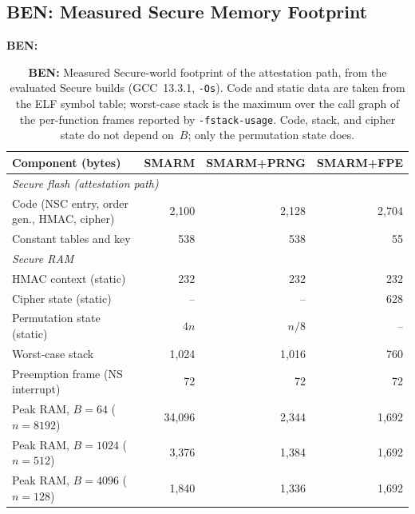 \documentclass{ieeeaccess}
\DeclareRobustCommand{\ben}[1]{{\color{BENcolor}\textbf{BEN:} #1}}
\newcommand{\rtsmarmone}{SMARM+PRNG\xspace}
\newcommand{\rtsmarmtwo}{SMARM+FPE\xspace}
\begin{document}
\subsection{\ben{Measured Secure Memory Footprint}}
\label{sec:footprint}

\begin{table}[!ht]
  \centering
  \small
  \setlength{\tabcolsep}{4pt}
  \ben{%
  \begin{tabular}{lrrr}
    \toprule
    \textbf{Component (bytes)} & \textbf{SMARM} & \textbf{\rtsmarmone} & \textbf{\rtsmarmtwo} \\
    \midrule
    \multicolumn{4}{l}{\emph{Secure flash (attestation path)}} \\
    Code (NSC entry, order gen., HMAC, cipher) & 2{,}100 & 2{,}128 & 2{,}704 \\
    Constant tables and key & 538 & 538 & 55 \\
    \midrule
    \multicolumn{4}{l}{\emph{Secure RAM}} \\
    HMAC context (static) & 232 & 232 & 232 \\
    Cipher state (static) & -- & -- & 628 \\
    Permutation state (static) & $4n$ & $n/8$ & -- \\
    Worst-case stack & 1{,}024 & 1{,}016 & 760 \\
    Preemption frame (NS interrupt) & 72 & 72 & 72 \\
    \midrule
    Peak RAM, $B = 64$ ($n = 8192$) & 34{,}096 & 2{,}344 & 1{,}692 \\
    \rowcolor{gray!15}
    Peak RAM, $B = 1024$ ($n = 512$) & 3{,}376 & 1{,}384 & 1{,}692 \\
    Peak RAM, $B = 4096$ ($n = 128$) & 1{,}840 & 1{,}336 & 1{,}692 \\
    \bottomrule
  \end{tabular}}
  \caption{\ben{Measured Secure-world footprint of the attestation path, from the evaluated Secure builds (GCC~13.3.1, \texttt{-Os}). Code and static data are taken from the ELF symbol table; worst-case stack is the maximum over the call graph of the per-function frames reported by \texttt{-fstack-usage}. Code, stack, and cipher state do not depend on~$B$; only the permutation state does.}}
  \label{tab:footprint}
\end{table}
\end{document}
